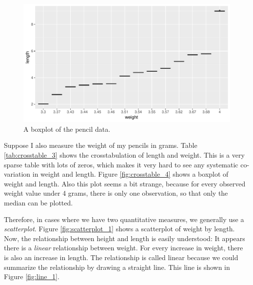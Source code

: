 \documentclass[]{report}\usepackage[]{graphicx}\usepackage[]{color}
\makeatletter
\def\maxwidth{ %
  \ifdim\Gin@nat@width>\linewidth
    \linewidth
  \else
    \Gin@nat@width
  \fi
}
\makeatother
\begin{document}
\begin{figure}

{\centering \includegraphics[width=\maxwidth]{figure/crosstable_5-1} 

}

\caption[A boxplot of the pencil data]{A boxplot of the pencil data.}\label{fig:crosstable_5}
\end{figure}



Suppose I also measure the weight of my pencils in grams. Table \ref{tab:crosstable_3} shows the crosstabulation of length and weight. This is a very sparse table with lots of zeros, which makes it very hard to see any systematic co-variation in weight and length. Figure \ref{fig:crosstable_4} shows a boxplot of weight and length. Also this plot seems a bit strange, because for every observed weight value under 4 grams, there is only one observation, so that only the median can be plotted. 




Therefore, in cases where we have two quantitative measures, we generally use a \textit{scatterplot}. Figure \ref{fig:scatterplot_1} shows a scatterplot of weight by length. Now, the relationship between height and length is easily understood: It appears there is a \textit{linear} relationship between weight. For every increase in weight, there is also an increase in length. The relationship is called linear because we could summarize the relationship by drawing a straight line. This line is shown in Figure \ref{fig:line_1}.
\end{document}
